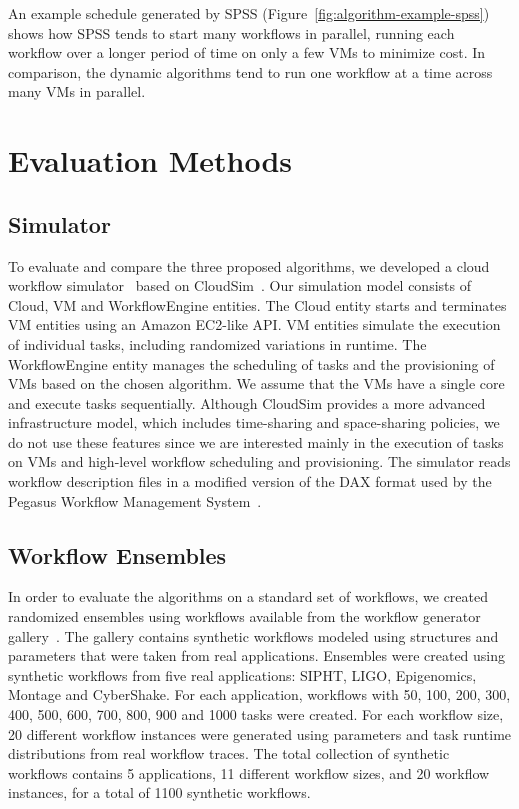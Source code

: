 \documentclass[preprint,5p]{elsarticle}
\begin{document}
An example schedule generated by SPSS (Figure~\ref{fig:algorithm-example-spss})
shows how SPSS tends to start many workflows in parallel, running each workflow
over a longer period of time on only a few VMs to minimize cost. In comparison,
the dynamic algorithms tend to run one workflow at a time across many VMs in
parallel.


\section{Evaluation Methods}
\label{sec:performance}


\subsection{Simulator}

To evaluate and compare the three proposed algorithms, we developed a cloud
workflow simulator~\cite{CloudWorkflowSimulator} based on CloudSim~\cite{Calheiros2011}. Our
simulation model consists of Cloud, VM and WorkflowEngine entities. The Cloud entity starts and
terminates VM entities using an Amazon EC2-like API. VM entities simulate the
execution of individual tasks, including randomized variations in runtime. The
WorkflowEngine entity manages the scheduling of tasks and the provisioning of 
VMs based on the chosen algorithm. We assume that the VMs have a single core
and execute tasks sequentially. 
Although CloudSim provides a more advanced infrastructure model, which includes
time-sharing and space-sharing policies, we do not use these features since we
are interested mainly in the execution of tasks on VMs and high-level workflow
scheduling and provisioning. 
The simulator reads workflow description files in
a modified version of the DAX format used by the Pegasus Workflow Management
System~\cite{Deelman2005}. 


\subsection{Workflow Ensembles}
\label{sec:ensembles}


In order to evaluate the algorithms on a standard set of workflows, we created
randomized ensembles using workflows available from the workflow generator
gallery~\cite{WorkflowGenerator}. The
gallery contains synthetic workflows modeled using structures and parameters
that were taken from real applications. Ensembles were created using synthetic
workflows from five real applications: SIPHT, LIGO, Epigenomics, Montage and
CyberShake. For each application, workflows with 50, 100, 200, 300,
400, 500, 600, 700, 800, 900 and 1000 tasks were created. For each workflow
size, 20 different workflow instances were generated using parameters and task
runtime distributions from real workflow traces. The total collection of
synthetic workflows contains 5 applications, 11 different workflow sizes, and 20
workflow instances, for a total of 1100 synthetic workflows.
\end{document}
